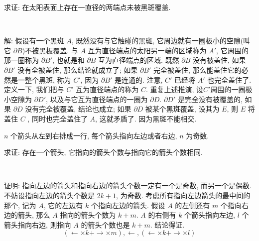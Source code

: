 求证: 在太阳表面上存在一直径的两端点未被黑斑覆盖.

~

解: 假设有一个黑斑 $A$, 既然没有与它触碰的黑斑, 它周边就有一圈极小的空隙(叫它 $\partial B$)不被黑板覆盖. 与 $A$ 互为直径端点的太阳另一端的区域称为 $A'$, 它周围的那一圈称为 $\partial B'$, 也就是和 $\partial B$ 互为直径端点的区域. 既然 $\partial B$ 没有被盖住, 如果 $\partial B'$ 没有全被盖住, 那么结论就成立了; 如果 $\partial B'$ 完全被盖住, 那么能盖住它的必然是一整个黑斑, 称为 $C'$, 因为 $\partial B'$ 是连通的. 注意, $C'$ 已经将 $A'$ 也完全盖住了. 定义一下, 我们把与 $C'$ 互为直径端点的称为 $C$. 重复上述推演, 设$C'$周围的一圈极小空隙为 $\partial D'$, 以及与它互为直径端点的一圈为 $\partial D$. $\partial D'$ 是完全没有被覆盖的, 如果 $\partial D$ 没有完全被覆盖, 结论也成立; 如果 $\partial D$ 被某个黑斑覆盖, 设其为 $E$, 则 $E$ 将盖住 $C$ , 同时也完全盖住了 $A$, 这就矛盾了. 因为黑斑不能相交.
​​\begin{figure*}[htbp]
\centering
{}
\end{figure*}


\newpage

$n$ 个箭头从左到右排成一行, 每个箭头指向左边或者右边, $n$ 为奇数. 

求证: 存在一个箭头, 它指向的箭头个数与指向它的箭头个数相同.

~

证明: 指向左边的箭头和指向右边的箭头个数一定有一个是奇数, 而另一个是偶数. 不妨设指向左边的箭头个数是 $2k+1$, 为奇数. 考虑所有指向左边箭头的最中间的那个, 记为 $A$, 它的左边有 $k$ 个指向左边的箭头. 假设 $A$ 的左侧还有 $m$ 个指向右边的箭头, 那么 $A$ 指向的箭头个数为 $k+m$. $A$ 的右侧有 $k$ 个箭头指向左边, $l$ 个箭头指向右边, 则指向 $A$ 的箭头个数也是 $k+m$. 结论得证.
\[ (\leftarrow\times k + \rightarrow\times m), \leftarrow , (\leftarrow\times k + \rightarrow\times l)\]

